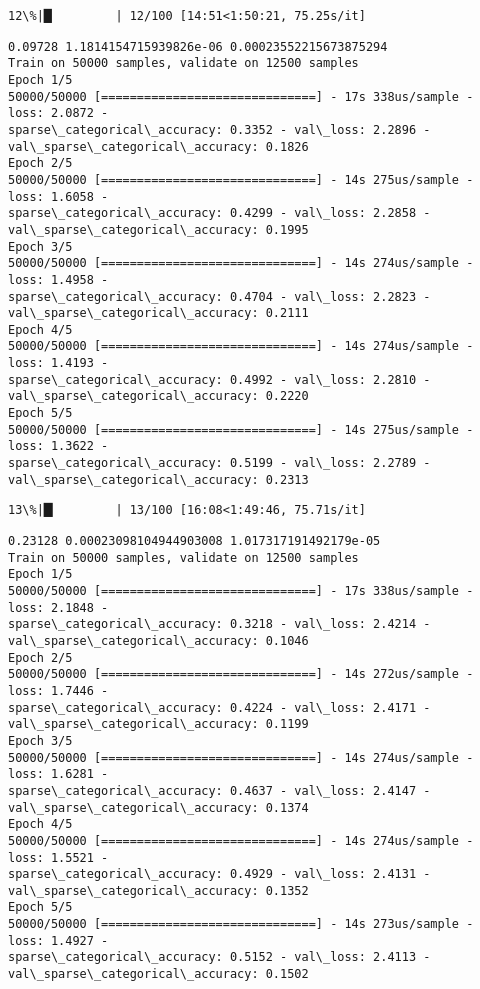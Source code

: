 \documentclass[11pt]{article}
\begin{document}
    \begin{Verbatim}[commandchars=\\\{\}]
 12\%|█▏        | 12/100 [14:51<1:50:21, 75.25s/it]
    \end{Verbatim}

    \begin{Verbatim}[commandchars=\\\{\}]
0.09728 1.1814154715939826e-06 0.00023552215673875294
Train on 50000 samples, validate on 12500 samples
Epoch 1/5
50000/50000 [==============================] - 17s 338us/sample - loss: 2.0872 -
sparse\_categorical\_accuracy: 0.3352 - val\_loss: 2.2896 -
val\_sparse\_categorical\_accuracy: 0.1826
Epoch 2/5
50000/50000 [==============================] - 14s 275us/sample - loss: 1.6058 -
sparse\_categorical\_accuracy: 0.4299 - val\_loss: 2.2858 -
val\_sparse\_categorical\_accuracy: 0.1995
Epoch 3/5
50000/50000 [==============================] - 14s 274us/sample - loss: 1.4958 -
sparse\_categorical\_accuracy: 0.4704 - val\_loss: 2.2823 -
val\_sparse\_categorical\_accuracy: 0.2111
Epoch 4/5
50000/50000 [==============================] - 14s 274us/sample - loss: 1.4193 -
sparse\_categorical\_accuracy: 0.4992 - val\_loss: 2.2810 -
val\_sparse\_categorical\_accuracy: 0.2220
Epoch 5/5
50000/50000 [==============================] - 14s 275us/sample - loss: 1.3622 -
sparse\_categorical\_accuracy: 0.5199 - val\_loss: 2.2789 -
val\_sparse\_categorical\_accuracy: 0.2313
    \end{Verbatim}

    \begin{Verbatim}[commandchars=\\\{\}]
 13\%|█▎        | 13/100 [16:08<1:49:46, 75.71s/it]
    \end{Verbatim}

    \begin{Verbatim}[commandchars=\\\{\}]
0.23128 0.00023098104944903008 1.017317191492179e-05
Train on 50000 samples, validate on 12500 samples
Epoch 1/5
50000/50000 [==============================] - 17s 338us/sample - loss: 2.1848 -
sparse\_categorical\_accuracy: 0.3218 - val\_loss: 2.4214 -
val\_sparse\_categorical\_accuracy: 0.1046
Epoch 2/5
50000/50000 [==============================] - 14s 272us/sample - loss: 1.7446 -
sparse\_categorical\_accuracy: 0.4224 - val\_loss: 2.4171 -
val\_sparse\_categorical\_accuracy: 0.1199
Epoch 3/5
50000/50000 [==============================] - 14s 274us/sample - loss: 1.6281 -
sparse\_categorical\_accuracy: 0.4637 - val\_loss: 2.4147 -
val\_sparse\_categorical\_accuracy: 0.1374
Epoch 4/5
50000/50000 [==============================] - 14s 274us/sample - loss: 1.5521 -
sparse\_categorical\_accuracy: 0.4929 - val\_loss: 2.4131 -
val\_sparse\_categorical\_accuracy: 0.1352
Epoch 5/5
50000/50000 [==============================] - 14s 273us/sample - loss: 1.4927 -
sparse\_categorical\_accuracy: 0.5152 - val\_loss: 2.4113 -
val\_sparse\_categorical\_accuracy: 0.1502
    \end{Verbatim}
\end{document}

